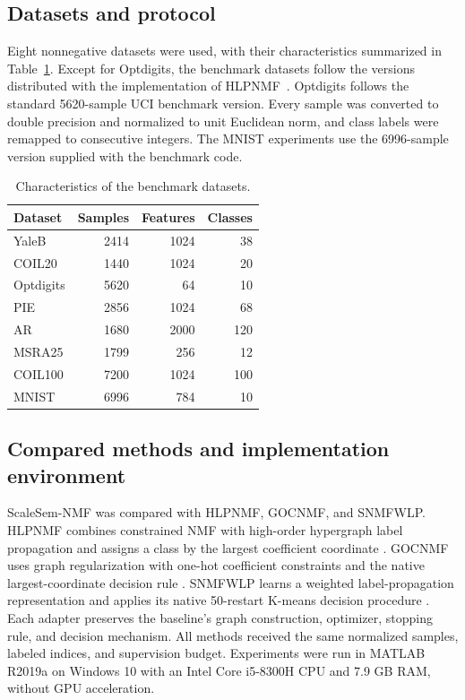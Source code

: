 \documentclass[a4paper,preprint,12pt]{elsarticle}
\newcommand{\PRtablefont}{\fontsize{10}{12}\selectfont}
\theoremstyle{remark}
\begin{document}
\subsection{Datasets and protocol}

Eight nonnegative datasets were used, with their characteristics summarized in Table~\ref{tab:datasets}. Except for Optdigits, the benchmark datasets follow the versions distributed with the implementation of HLPNMF~\cite{Li2026HLPNMF}. Optdigits follows the standard 5620-sample UCI benchmark version. Every sample was converted to double precision and normalized to unit Euclidean norm, and class labels were remapped to consecutive integers. The MNIST experiments use the 6996-sample version supplied with the benchmark code.

\begin{table}[!htbp]
\centering
\caption{Characteristics of the benchmark datasets.}
\label{tab:datasets}
\PRtablefont
\begin{tabular}{lrrr}
\toprule
Dataset & Samples & Features & Classes \\
\midrule
YaleB & 2414 & 1024 & 38 \\
COIL20 & 1440 & 1024 & 20 \\
Optdigits & 5620 & 64 & 10 \\
PIE & 2856 & 1024 & 68 \\
AR & 1680 & 2000 & 120 \\
MSRA25 & 1799 & 256 & 12 \\
COIL100 & 7200 & 1024 & 100 \\
MNIST & 6996 & 784 & 10 \\
\bottomrule
\end{tabular}
\end{table}

\subsection{Compared methods and implementation environment}

ScaleSem-NMF was compared with HLPNMF, GOCNMF, and SNMFWLP. HLPNMF combines constrained NMF with high-order hypergraph label propagation and assigns a class by the largest coefficient coordinate \cite{Li2026HLPNMF}. GOCNMF uses graph regularization with one-hot coefficient constraints and the native largest-coordinate decision rule \cite{Li2025GOCNMF}. SNMFWLP learns a weighted label-propagation representation and applies its native 50-restart K-means decision procedure \cite{Jing2026SNMFWLP}. Each adapter preserves the baseline's graph construction, optimizer, stopping rule, and decision mechanism. All methods received the same normalized samples, labeled indices, and supervision budget. Experiments were run in MATLAB R2019a on Windows 10 with an Intel Core i5-8300H CPU and 7.9 GB RAM, without GPU acceleration.
\end{document}
